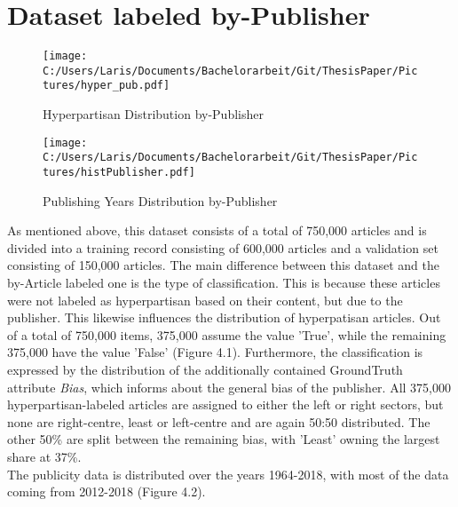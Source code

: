 \documentclass[a4paper, 11pt,titlepage,oneside,openany]{book}
\begin{document}
\section{Dataset labeled by-Publisher}
\begin{figure}[h]
	\begin{minipage}{.45\linewidth}
		\texttt{[image: C:/Users/Laris/Documents/Bachelorarbeit/Git/ThesisPaper/Pictures/hyper\_pub.pdf]}
		\caption{Hyperpartisan Distribution by-Publisher}
	\end{minipage}
	\hspace{.1\linewidth}%
	\begin{minipage}{.45\linewidth}
		\texttt{[image: C:/Users/Laris/Documents/Bachelorarbeit/Git/ThesisPaper/Pictures/histPublisher.pdf]}
		\caption{Publishing Years Distribution by-Publisher}
	\end{minipage}
\end{figure} 
\noindent As mentioned above, this dataset consists of a total of 750,000 articles and is divided into a training record consisting of 600,000 articles and a validation set consisting of 150,000 articles.
The main difference between this dataset and the by-Article labeled one is the type of classification. This is because these articles were not labeled as hyperpartisan based on their content, but due to the publisher. This likewise influences the distribution of hyperpatisan articles.
 Out of a total of 750,000 items, 375,000 assume the value 'True', while the remaining 375,000 have the value 'False' (Figure 4.1). 
Furthermore, the classification is expressed by the distribution of the additionally contained GroundTruth attribute \textit{Bias}, which informs about the general bias of the publisher. All 375,000 hyperpartisan-labeled articles are assigned to either the left or right sectors, but none are right-centre, least or left-centre and are again 50:50 distributed. The other 50\% are split between the remaining bias, with 'Least' owning the largest share at 37\%.\\
The publicity data is distributed over the years 1964-2018, with most of the data coming from 2012-2018 (Figure 4.2).
\end{document}
